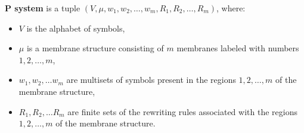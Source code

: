 {\bf P system} is a tuple $(V, \mu, w_1, w_2,\dots , w_m, R_1, R_2, \dots , R_m)$, where:
\begin{itemize}
  \item $V$ is the alphabet of symbols,
  \item $\mu$ is a membrane structure consisting of $m$ membranes labeled with numbers $1,2,\dots,m$,
  \item $w_1,w_2,\dots w_m$ are multisets of symbols present in the regions $1,2,\dots,m$ of the membrane structure,
  \item $R_1,R_2,\dots R_m$ are finite sets of the rewriting rules associated with the regions $1,2,\dots,m$ of the membrane structure.
\end{itemize}
